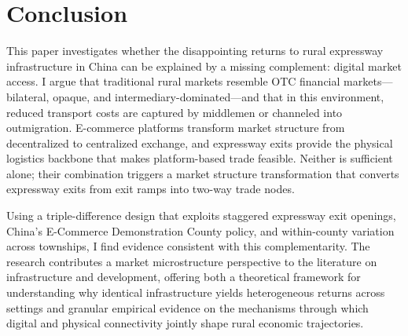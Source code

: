 \documentclass[12pt]{article}
\begin{document}
\section{Conclusion}\label{sec:conclusion}

This paper investigates whether the disappointing returns to rural expressway infrastructure in China can be explained by a missing complement: digital market access. I argue that traditional rural markets resemble OTC financial markets---bilateral, opaque, and intermediary-dominated---and that in this environment, reduced transport costs are captured by middlemen or channeled into outmigration. E-commerce platforms transform market structure from decentralized to centralized exchange, and expressway exits provide the physical logistics backbone that makes platform-based trade feasible. Neither is sufficient alone; their combination triggers a market structure transformation that converts expressway exits from exit ramps into two-way trade nodes.

Using a triple-difference design that exploits staggered expressway exit openings, China's E-Commerce Demonstration County policy, and within-county variation across townships, I find evidence consistent with this complementarity. The research contributes a market microstructure perspective to the literature on infrastructure and development, offering both a theoretical framework for understanding why identical infrastructure yields heterogeneous returns across settings and granular empirical evidence on the mechanisms through which digital and physical connectivity jointly shape rural economic trajectories.

\clearpage

\end{document}
